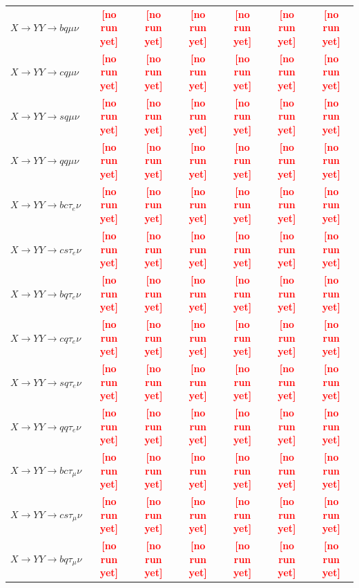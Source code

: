 \documentclass[12pt]{article}   %
\newcommand{\pending}[1]{\textcolor{red}{\textbf{[#1]}}}
\begin{document}
\begin{landscape}
{\begin{longtable}{@{\extracolsep{\fill}}lcccccc@{}}
$X\to YY\to bq\mu\nu$ & \pending{no run yet} & \pending{no run yet} & \pending{no run yet} & \pending{no run yet} & \pending{no run yet} & \pending{no run yet} \\
$X\to YY\to cq\mu\nu$ & \pending{no run yet} & \pending{no run yet} & \pending{no run yet} & \pending{no run yet} & \pending{no run yet} & \pending{no run yet} \\
$X\to YY\to sq\mu\nu$ & \pending{no run yet} & \pending{no run yet} & \pending{no run yet} & \pending{no run yet} & \pending{no run yet} & \pending{no run yet} \\
$X\to YY\to qq\mu\nu$ & \pending{no run yet} & \pending{no run yet} & \pending{no run yet} & \pending{no run yet} & \pending{no run yet} & \pending{no run yet} \\
\midrule
$X\to YY\to bc\tau_e\nu$ & \pending{no run yet} & \pending{no run yet} & \pending{no run yet} & \pending{no run yet} & \pending{no run yet} & \pending{no run yet} \\
$X\to YY\to cs\tau_e\nu$ & \pending{no run yet} & \pending{no run yet} & \pending{no run yet} & \pending{no run yet} & \pending{no run yet} & \pending{no run yet} \\
$X\to YY\to bq\tau_e\nu$ & \pending{no run yet} & \pending{no run yet} & \pending{no run yet} & \pending{no run yet} & \pending{no run yet} & \pending{no run yet} \\
$X\to YY\to cq\tau_e\nu$ & \pending{no run yet} & \pending{no run yet} & \pending{no run yet} & \pending{no run yet} & \pending{no run yet} & \pending{no run yet} \\
$X\to YY\to sq\tau_e\nu$ & \pending{no run yet} & \pending{no run yet} & \pending{no run yet} & \pending{no run yet} & \pending{no run yet} & \pending{no run yet} \\
$X\to YY\to qq\tau_e\nu$ & \pending{no run yet} & \pending{no run yet} & \pending{no run yet} & \pending{no run yet} & \pending{no run yet} & \pending{no run yet} \\
$X\to YY\to bc\tau_\mu\nu$ & \pending{no run yet} & \pending{no run yet} & \pending{no run yet} & \pending{no run yet} & \pending{no run yet} & \pending{no run yet} \\
$X\to YY\to cs\tau_\mu\nu$ & \pending{no run yet} & \pending{no run yet} & \pending{no run yet} & \pending{no run yet} & \pending{no run yet} & \pending{no run yet} \\
$X\to YY\to bq\tau_\mu\nu$ & \pending{no run yet} & \pending{no run yet} & \pending{no run yet} & \pending{no run yet} & \pending{no run yet} & \pending{no run yet} \\

\end{longtable}}
\end{landscape}
\end{document}

